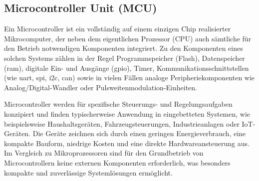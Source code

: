 \subsection{Microcontroller Unit (MCU)}
Ein Microcontroller ist ein vollständig auf einem einzigen Chip realisierter Mikrocomputer, der neben dem eigentlichen Prozessor (CPU) auch sämtliche für den Betrieb notwendigen Komponenten integriert. 
Zu den Komponenten eines solchen Systems zählen in der Regel Programmspeicher (Flash), Datenspeicher (\gls{ram}), digitale Ein- und Ausgänge (\gls{gpio}), Timer, Kommunikationsschnittstellen (wie \gls{uart}, \gls{spi}, \gls{i2c}, \gls{can}) sowie in vielen Fällen analoge Peripheriekomponenten wie Analog/Digital-Wandler oder Pulsweitenmodulation-Einheiten.

Microcontroller werden für spezifische Steuerungs- und Regelungsaufgaben konzipiert und finden typischerweise Anwendung in eingebetteten Systemen, wie beispielsweise Haushaltsgeräten, Fahrzeugsteuerungen, Industrieanlagen oder IoT-Geräten. 
Die Geräte zeichnen sich durch einen geringen Energieverbrauch, eine kompakte Bauform, niedrige Kosten und eine direkte Hardwareansteuerung aus. 
Im Vergleich zu Mikroprozessoren sind für den Grundbetrieb von Microcontrollern keine externen Komponenten erforderlich, was besonders kompakte und zuverlässige Systemlösungen ermöglicht.


